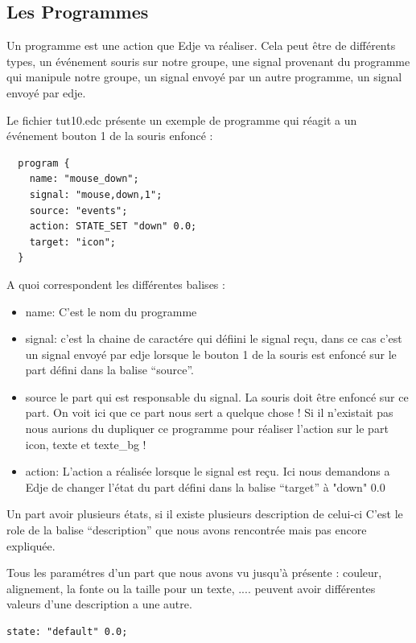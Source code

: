 \documentclass[a4paper]{efr}
\begin{document}
\subsection{Les Programmes}

Un programme est une action que Edje va réaliser. Cela peut être de différents
types, un événement souris sur notre groupe, une signal provenant du programme
qui manipule notre groupe, un signal envoyé par un autre programme, un signal
envoyé par edje.

Le fichier tut10.edc présente un exemple de programme qui réagit a un événement
bouton 1 de la souris enfoncé :

\begin{lstlisting}
  program {
    name: "mouse_down";
    signal: "mouse,down,1";
    source: "events";
    action: STATE_SET "down" 0.0;
    target: "icon";
  }
\end{lstlisting}

A quoi correspondent les différentes balises :

\begin{itemize}
\item name: C'est le nom du programme
\item signal: c'est la chaine de caractére qui défiini le signal reçu, dans ce
cas c'est un signal envoyé par edje lorsque le bouton 1 de la souris est enfoncé
sur le part défini dans la balise ``source''.
\item source le part qui est responsable  du signal. La souris doit être enfoncé sur ce
part. On voit ici que ce part nous sert a quelque chose ! Si il n'existait pas
nous aurions du dupliquer ce programme pour réaliser l'action sur le part icon,
texte et texte_bg !
\item action: L'action a réalisée lorsque le signal est reçu. Ici nous demandons
a Edje de changer l'état du part défini dans la balise ``target'' à "down" 0.0
\end{itemize}

Un part avoir plusieurs états, si il existe plusieurs description de celui-ci
C'est le role de la balise ``description'' que nous avons rencontrée mais pas
encore expliquée.

Tous les paramétres d'un part que nous avons vu jusqu'à présente : couleur,
alignement, la fonte ou la taille pour un texte, .... peuvent avoir différentes
valeurs d'une description a une autre.

\begin{lstlisting}
state: "default" 0.0;
\end{lstlisting}
\end{document}
